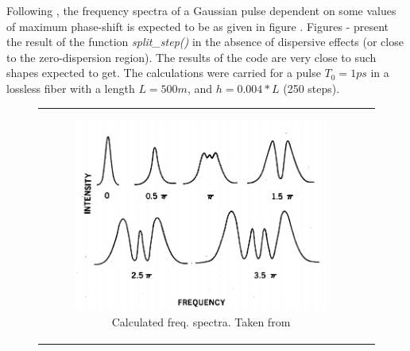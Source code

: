     Following \citep{stolen}, the frequency spectra of a Gaussian pulse dependent on some values of maximum phase-shift is expected to be as given in figure . Figures - present the result of the function \emph{split\_step()} in the absence of dispersive effects (or close to the zero-dispersion region). The results of the code are very close to such shapes expected to get. The calculations were carried for a pulse $T_0 = 1ps$ in a lossless fiber with a length $L = 500m$, and $h = 0.004*L$ (250 steps).
    
     \begin{figure}[label={fig:spmssfm}, caption={Shape of the spectra for Gaussian pulses by maximum phase shift ($\phi_{NL}$).}]
         \centering	
         \begin{tabular}[c]{cc}
         \centering	
        \begin{subfigure}[b]{.53\textwidth}
		    \centering	
            \includegraphics[width=1\linewidth]{figures/chap3/ssfm_spm/stolen_SPM.png}
            \caption{Calculated freq. spectra. Taken from \citep{stolen}}
            \label{fig:spmstol}
        \end{subfigure}
        \hfill
        \begin{subfigure}[b]{.53\textwidth}
		    \centering	

\end{subfigure}
\end{tabular}
\end{figure}
